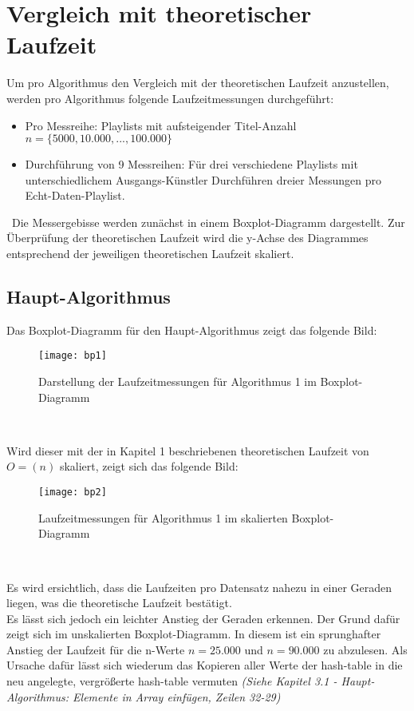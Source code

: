 \documentclass[
10pt, %
a4paper, %
oneside, %
headinclude,footinclude, %
BCOR5mm, %
]{scrartcl}
\begin{document}
\section{Vergleich mit theoretischer Laufzeit}
Um pro Algorithmus den Vergleich mit der theoretischen Laufzeit anzustellen, werden pro Algorithmus folgende Laufzeitmessungen durchgeführt:
\begin{itemize}[noitemsep]
	\item Pro Messreihe: Playlists mit aufsteigender Titel-Anzahl \(n = \{5000,10.000,...,100.000\}\)
	\item Durchführung von 9 Messreihen:
	\subitem Für drei verschiedene Playlists mit unterschiedlichem Ausgangs-Künstler
	\subsubitem Durchführen dreier Messungen pro Echt-Daten-Playlist.
\end{itemize}\
Die Messergebisse werden zunächst in einem Boxplot-Diagramm dargestellt. Zur Überprüfung der theoretischen Laufzeit wird die y-Achse des Diagrammes entsprechend der jeweiligen theoretischen Laufzeit skaliert.

\subsection{Haupt-Algorithmus}
Das Boxplot-Diagramm für den Haupt-Algorithmus zeigt das folgende Bild:
\begin{figure}[h!]
	\centering 
	\texttt{[image: bp1]} 
	\caption[Darstellung Laufzeitmessungen Alg. 1 im Boxplot-Diagramm]{Darstellung der Laufzeitmessungen für Algorithmus 1 im Boxplot-Diagramm}
\end{figure}\

Wird dieser mit der in Kapitel 1 beschriebenen theoretischen Laufzeit von \(O=(n)\) skaliert, zeigt sich das folgende Bild:

\begin{figure}[h!]
	\centering 
	\texttt{[image: bp2]} 
	\caption[]{Laufzeitmessungen für Algorithmus 1 im skalierten Boxplot-Diagramm}
\end{figure}\

Es wird ersichtlich, dass die Laufzeiten pro Datensatz nahezu in einer Geraden liegen, was die theoretische Laufzeit bestätigt. \\
Es lässt sich jedoch ein leichter Anstieg der Geraden erkennen. Der Grund dafür zeigt sich im unskalierten Boxplot-Diagramm. In diesem ist ein sprunghafter Anstieg der Laufzeit für die n-Werte \(n=25.000\) und \(n=90.000\) zu abzulesen. Als Ursache dafür lässt sich wiederum das Kopieren aller Werte der hash-table in die neu angelegte, vergrößerte hash-table vermuten \textit{(Siehe Kapitel 3.1 - Haupt-Algorithmus: Elemente in Array einfügen, Zeilen 32-29)}
\end{document}
